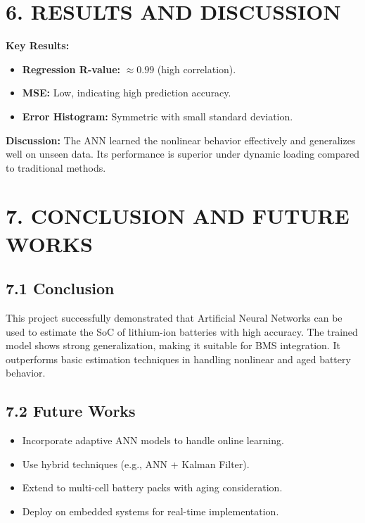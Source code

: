 \documentclass[12pt]{article}
\begin{document}
\section*{6. RESULTS AND DISCUSSION}
\textbf{Key Results:}
\begin{itemize}
    \item \textbf{Regression R-value:} $\approx 0.99$ (high correlation).
    \item \textbf{MSE:} Low, indicating high prediction accuracy.
    \item \textbf{Error Histogram:} Symmetric with small standard deviation.
\end{itemize}

\textbf{Discussion:} The ANN learned the nonlinear behavior effectively and generalizes well on unseen data. Its performance is superior under dynamic loading compared to traditional methods.

\section*{7. CONCLUSION AND FUTURE WORKS}
\subsection*{7.1 Conclusion}
This project successfully demonstrated that Artificial Neural Networks can be used to estimate the SoC of lithium-ion batteries with high accuracy. The trained model shows strong generalization, making it suitable for BMS integration. It outperforms basic estimation techniques in handling nonlinear and aged battery behavior.

\subsection*{7.2 Future Works}
\begin{itemize}
    \item Incorporate adaptive ANN models to handle online learning.
    \item Use hybrid techniques (e.g., ANN + Kalman Filter).
    \item Extend to multi-cell battery packs with aging consideration.
    \item Deploy on embedded systems for real-time implementation.
\end{itemize}
\end{document}
